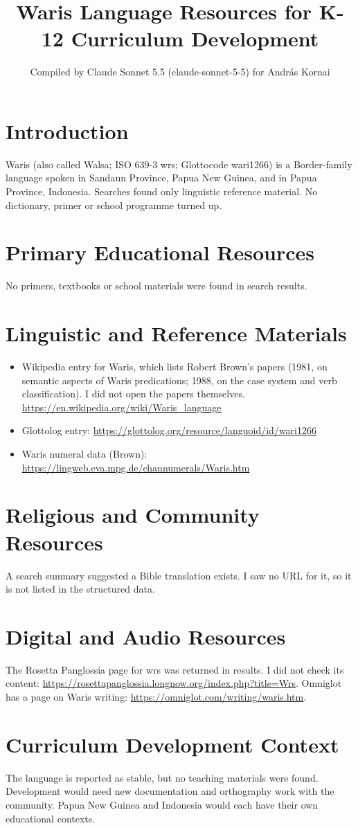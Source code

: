 \documentclass[12pt]{article}
\title{Waris Language Resources for K-12 Curriculum Development}
\author{Compiled by Claude Sonnet 5.5 (claude-sonnet-5-5) for Andr\'as Kornai}
\date{}
\begin{document}
\maketitle

\section{Introduction}
Waris (also called Walsa; ISO 639-3 wrs; Glottocode wari1266) is a Border-family language spoken in Sandaun Province, Papua New Guinea, and in Papua Province, Indonesia. Searches found only linguistic reference material. No dictionary, primer or school programme turned up.

\section{Primary Educational Resources}
No primers, textbooks or school materials were found in search results.

\section{Linguistic and Reference Materials}
\begin{itemize}
\item Wikipedia entry for Waris, which lists Robert Brown's papers (1981, on semantic aspects of Waris predications; 1988, on the case system and verb classification). I did not open the papers themselves. \url{https://en.wikipedia.org/wiki/Waris_language}
\item Glottolog entry: \url{https://glottolog.org/resource/languoid/id/wari1266}
\item Waris numeral data (Brown): \url{https://lingweb.eva.mpg.de/channumerals/Waris.htm}
\end{itemize}

\section{Religious and Community Resources}
A search summary suggested a Bible translation exists. I saw no URL for it, so it is not listed in the structured data.

\section{Digital and Audio Resources}
The Rosetta Panglossia page for wrs was returned in results. I did not check its content: \url{https://rosettapanglossia.longnow.org/index.php?title=Wrs}. Omniglot has a page on Waris writing: \url{https://omniglot.com/writing/waris.htm}.

\section{Curriculum Development Context}
The language is reported as stable, but no teaching materials were found. Development would need new documentation and orthography work with the community. Papua New Guinea and Indonesia would each have their own educational contexts.
\end{document}
